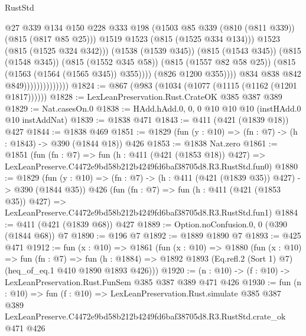 \begin{lexlean}{RustStd}
\begin{coremodule}
                                              @27
                                              @339
                                              @134
                                              @150
                                              @228
                                              @333
                                              @198
                                              (@1503
                                                @85
                                                @339
                                                (@810 (@811 @339))
                                                (@815 (@817 @85 @25)))
                                              @1519
                                              @1523
                                              (@815 (@1525 @334 @134)))
                                            @1523
                                            (@815 (@1525 @324 @342)))
                                          (@1538 (@1539 @345))
                                          (@815 (@1543 @345))
                                          (@815 (@1548 @345))
                                          (@815 (@1552 @345 @58))
                                          (@815 (@1557 @82 @58 @25))
                                          (@815 (@1563 (@1564 (@1565 @345)) @355))))
                                      (@826 @1200 @355))))
                                @834
                                @838
                                @842
                                @849))))))))))))))
@1824 := @867 (@983 (@1034 (@1077 (@1115 (@1162 (@1201 @1817))))))
@1828 := LexLeanPreservation.Rust.CrateOK @385 @387 @389
@1829 := Nat.casesOn.{0}
@1838 := HAdd.hAdd.{0, 0, 0} @10 @10 @10 (instHAdd.{0} @10 instAddNat)
@1839 := @1838 @471
@1843 := @411 (@421 (@1839 @18)) @427
@1844 := @1838 @469
@1851 := @1829 (fun (y : @10) => (fn : @7) -> (h : @1843) -> @390 (@1844 @18)) @426
@1853 := @1838 Nat.zero
@1861 := @1851
    (fun (fn : @7) =>
    fun (h : @411 (@421 (@1853 @18)) @427) =>
    LexLeanPreserve.C4472e9bd58b212b4249fd6baf38705d8.R3.RustStd.fun0)
@1880 := @1829
    (fun (y : @10) => (fn : @7) -> (h : @411 (@421 (@1839 @35)) @427) -> @390 (@1844 @35))
    @426
    (fun (fn : @7) =>
    fun (h : @411 (@421 (@1853 @35)) @427) =>
    LexLeanPreserve.C4472e9bd58b212b4249fd6baf38705d8.R3.RustStd.fun1)
@1884 := @411 (@421 (@1839 @68)) @427
@1889 := Option.noConfusion.{0, 0} (@390 (@1844 @68)) @7
@1890 := @196 @7
@1892 := @1889 @1890 @7
@1893 := @425 @471
@1912 := fun (x : @10) =>
  @1861
    (fun (x : @10) =>
    @1880
      (fun (x : @10) =>
      fun (fn : @7) =>
      fun (h : @1884) =>
      @1892 @1893 (Eq.refl.{2} (Sort 1) @7) (heq_of_eq.{1} @410 @1890 @1893 @426)))
@1920 := (n : @10) -> (f : @10) -> LexLeanPreservation.Rust.FunSem @385 @387 @389 @471 @426
@1930 := fun (n : @10) =>
  fun (f : @10) =>
  LexLeanPreservation.Rust.simulate
    @385
    @387
    @389
    LexLeanPreserve.C4472e9bd58b212b4249fd6baf38705d8.R3.RustStd.crate_ok
    @471
    @426
\end{coremodule}
\end{lexlean}
